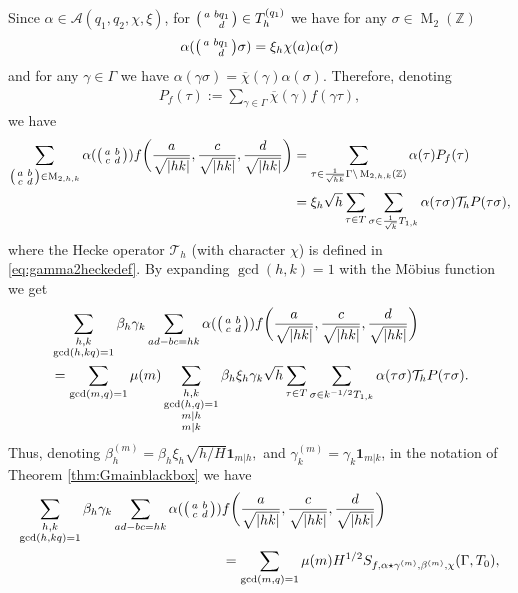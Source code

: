 \documentclass[12pt]{amsart}
\theoremstyle{definition}
\theoremstyle{remark}
\numberwithin{equation}{section}
\newcommand{\Z}{{\mathbb Z}}
\newcommand{\1}{{\mathbf 1}}
\newcommand{\MM}{\operatorname{M}}
\begin{document}
Since $\alpha \in  \mathcal{A}(q_1,q_2,\chi,\xi)$, for $\smqty(a & bq_1 \\ & d) \in  T_{h}^{(q_1)}$ we have  for any $ \sigma \in \MM_{2}(\Z)$ 
\begin{align*}
   \alpha ( \smqty(a & bq_1 \\ & d) \sigma )  = \xi_h \chi(a) \alpha(\sigma)
\end{align*}
and for any $\gamma \in \Gamma$ we have $\alpha(\gamma \sigma) = \overline{\chi}(\gamma)\alpha(\sigma)$. Therefore,  denoting
\begin{align*}
 P_{f}(\tau) :=  \sum_{\gamma \in \Gamma} \overline{\chi}(\gamma) f(\gamma \tau),
\end{align*}
we have
\begin{align*}
     \sum_{\substack{\smqty(a& b \\ c& d)\in \MM_{2,h,k}}}  \alpha(\smqty(a & b \\ c & d)) f\bigg(\frac{a}{ \sqrt{|hk|}},\frac{c}{ \sqrt{|hk|}},\frac{d}{ \sqrt{|hk|}}\bigg)&= \sum_{\tau \in \frac{1}{ \sqrt{hk}} \Gamma \backslash \MM_{2,h,k}(\Z) }\alpha(\tau) P_f (\tau)  \\
     &= \xi_h \sqrt{h}\sum_{\tau \in T} \sum_{\sigma \in \frac{1}{ \sqrt{k}}T_{1,k}} \alpha(\tau \sigma) \mathcal{T}_h P(\tau \sigma),
\end{align*}
where the Hecke operator $\mathcal{T}_h$ (with character $\chi$) is defined in \eqref{eq:gamma2heckedef}. By expanding $\gcd(h,k) =1$ with the M\"obius function we get
\begin{align*}
     &\sum_{\substack{ h,k\\\gcd(h,kq)=1}} \beta_h \gamma_k \sum_{ad-bc = hk}  \alpha (\smqty(a & b \\ c & d)) f\bigg(\frac{a}{ \sqrt{|hk|}},\frac{c}{ \sqrt{|hk|}},\frac{d}{ \sqrt{|hk|}}\bigg) \\
     &= \sum_{\gcd(m,q)=1} \mu(m)   \sum_{\substack{ h,k\\\gcd(h,q)=1 \\ m | h \\ m |k}} \beta_{h} \xi_h \gamma_{k} \sqrt{h}\sum_{\tau \in T} \sum_{\sigma \in k^{-1/2}T_{1,k}} \alpha(\tau \sigma) \mathcal{T}_h P(\tau \sigma).
\end{align*}
Thus, denoting $\beta^{(m)}_h = \beta_h \xi_h \sqrt{h/H} \mathbf{1}_{m|h}, $ and $ \gamma^{(m)}_k= \gamma_k \mathbf{1}_{m|k}$, in the notation of Theorem \ref{thm:Gmainblackbox} we have
\begin{align*}
    \sum_{\substack{ h,k\\\gcd(h,kq)=1}} \beta_h \gamma_k \sum_{ad-bc = hk}  \alpha (\smqty(a & b \\ c & d)) &f\bigg(\frac{a}{ \sqrt{|hk|}},\frac{c}{ \sqrt{|hk|}},\frac{d}{ \sqrt{|hk|}}\bigg)\\
    &=\sum_{\gcd(m,q)=1} \mu(m) H^{1/2} S_{f,\alpha  \star  \gamma^{(m)} ,\beta^{(m)},\chi}(\Gamma,T_0),
\end{align*}
\end{document}
